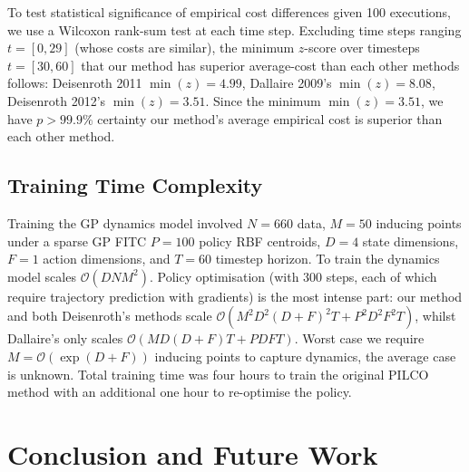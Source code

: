 \documentclass{article}
\begin{document}
To test statistical significance of empirical cost differences given 100 executions,
we use a Wilcoxon rank-sum test at each time step.
Excluding time steps ranging $t=[0,29]$ (whose costs are similar),
the minimum $z$-score over timesteps $t=[30,60]$
that our method has superior average-cost than each other methods follows:
Deisenroth 2011 $\min(z) = 4.99$,
Dallaire 2009's $\min(z) = 8.08$,
Deisenroth 2012's $\min(z) = 3.51$.
Since the minimum $\min(z) = 3.51$, we have $p>99.9\%$ certainty our method's
average empirical cost is superior than each other method.


\subsection{Training Time Complexity}
Training the GP dynamics model involved $N=660$ data, $M=50$ inducing points under a sparse GP FITC
$P=100$ policy RBF centroids, $D=4$ state dimensions, $F=1$ action dimensions, and $T=60$ timestep horizon.
To train the dynamics model scales $\mathcal{O}(DNM^2)$.
Policy optimisation (with 300 steps,
each of which require trajectory prediction with gradients) is the most intense part:
our method and both Deisenroth's methods scale $\mathcal{O}(M^2 D^2 (D+F)^2 T + P^2 D^2 F^2 T)$,
whilst Dallaire's only scales $\mathcal{O}(MD(D+F)T + PDFT)$.
Worst case we require $M = \mathcal{O}(\exp(D+F))$ inducing points to capture dynamics, the average case is unknown.
Total training time was four hours to train the original PILCO method
with an additional one hour to re-optimise the policy.

\section{Conclusion and Future Work}\label{sec:conclusions}

\newcommand{\graphscale}{0.89}
\newcommand{\xmins}{0}
\newcommand{\horizon}{60} %
\newcommand{\ymins}{0}
\newcommand{\ymaxs}{1}
\newcommand{\xticks}{0,10,20,30,40,50,60}
\newcommand{\xlabels}{Timestep}
\newcommand{\ylabels}{Cost}
\newcommand{\legends}{legend entries={
(NFexe | NFsim),
Dallaire (BFexe | BFMAPsim),
Deisenroth (BFexe | NFsim),
CtrlBF (BFexe | BFsim)},}
\newcommand{\legendstyle}{legend style={at={(0.955,0.96)},anchor=north east}}

\end{document}
